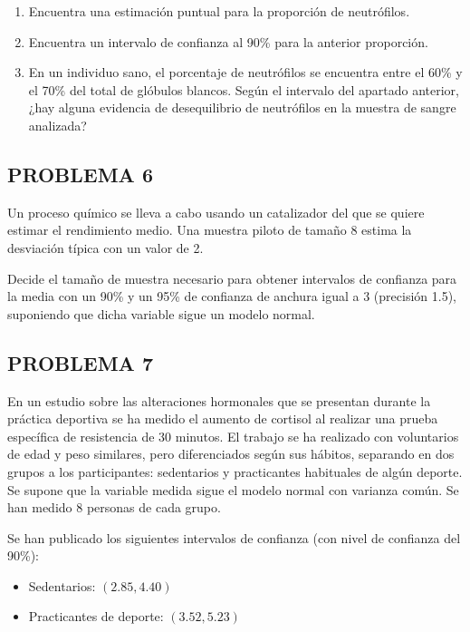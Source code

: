 \documentclass[
]{article}
\providecommand{\tightlist}{%
  \setlength{\itemsep}{0pt}\setlength{\parskip}{0pt}}
\begin{document}
\begin{enumerate}
\def\labelenumi{\alph{enumi})}
\tightlist
\item
  Encuentra una estimación puntual para la proporción de neutrófilos.\\
\item
  Encuentra un intervalo de confianza al 90\% para la anterior proporción.\\
\item
  En un individuo sano, el porcentaje de neutrófilos se encuentra entre el 60\% y el 70\% del total de glóbulos blancos. Según el intervalo del apartado anterior, ¿hay alguna evidencia de desequilibrio de neutrófilos en la muestra de sangre analizada?
\end{enumerate}

\subsection{PROBLEMA 6}\label{problema-6}

Un proceso químico se lleva a cabo usando un catalizador del que se quiere estimar el rendimiento medio. Una muestra piloto de tamaño 8 estima la desviación típica con un valor de 2.

Decide el tamaño de muestra necesario para obtener intervalos de confianza para la media con un 90\% y un 95\% de confianza de anchura igual a 3 (precisión 1.5), suponiendo que dicha variable sigue un modelo normal.

\subsection{PROBLEMA 7}\label{problema-7}

En un estudio sobre las alteraciones hormonales que se presentan durante la práctica deportiva se ha medido el aumento de cortisol al realizar una prueba específica de resistencia de 30 minutos. El trabajo se ha realizado con voluntarios de edad y peso similares, pero diferenciados según sus hábitos, separando en dos grupos a los participantes: sedentarios y practicantes habituales de algún deporte. Se supone que la variable medida sigue el modelo normal con varianza común. Se han medido 8 personas de cada grupo.

Se han publicado los siguientes intervalos de confianza (con nivel de confianza del 90\%):

\begin{itemize}
\tightlist
\item
  Sedentarios: \((2.85,4.40)\)\\
\item
  Practicantes de deporte: \((3.52,5.23)\)
\end{itemize}
\end{document}
